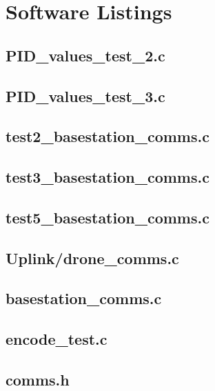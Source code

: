 \documentclass[a4paper,11pt]{article}
\begin{document}
\section{Software Listings}
\subsection{PID\_values\_test\_2.c}
 
\subsection{PID\_values\_test\_3.c}
 
\subsection{test2\_basestation\_comms.c}
 
 \subsection{test3\_basestation\_comms.c}
 
 \subsection{test5\_basestation\_comms.c}
 
  \subsection{Uplink/drone\_comms.c}
 
   \subsection{basestation\_comms.c}
 
   \subsection{encode\_test.c}
 
   \subsection{comms.h}
 
\end{document}
